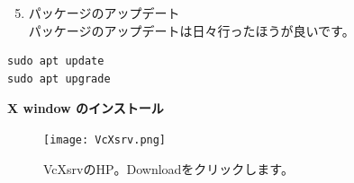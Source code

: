 \documentclass[uplatex,10pt,a4j]{jsarticle}
\begin{document}
\begin{enumerate}
  \setcounter{enumi}{4}
  \item パッケージのアップデート\\
        パッケージのアップデートは日々行ったほうが良いです。
\end{enumerate}
\begin{lstlisting}
sudo apt update
sudo apt upgrade
\end{lstlisting}

\vspace{1cm}
{\large \bf X window のインストール}
\vspace{0.5cm}

\begin{figure}[h]
  \begin{center}
    \texttt{[image: VcXsrv.png]}
    \caption{VcXsrvのHP。Downloadをクリックします。}
  \end{center}
\end{figure}
\end{document}
